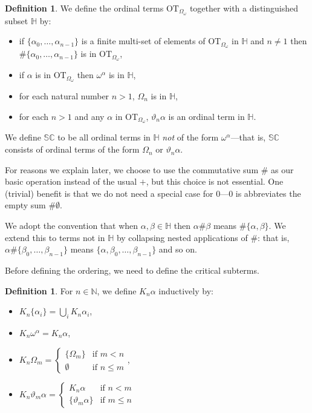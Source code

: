 \documentclass[11pt]{amsart}
\theoremstyle{definition}
\newtheorem{definition}[theorem]{Definition}
\begin{document}
\begin{definition}
  We define the ordinal terms $\mathrm{OT}_{\Omega_\omega}$ together with a distinguished subset $\mathbb{H}$ by:
  \begin{itemize}
  \item if $\{\alpha_0,\ldots,\alpha_{n-1}\}$ is a finite multi-set of elements of $\mathrm{OT}_{\Omega_\omega}$ in $\mathbb{H}$ and $n\neq 1$ then $\#\{\alpha_0,\ldots,\alpha_{n-1}\}$ is in $\mathrm{OT}_{\Omega_\omega}$,
  \item if $\alpha$ is in $\mathrm{OT}_{\Omega_\omega}$ then $\omega^\alpha$ is in $\mathbb{H}$,
  \item for each natural number $n>1$, $\Omega_n$ is in $\mathbb{H}$,
  \item for each $n>1$ and any $\alpha$ in $\mathrm{OT}_{\Omega_\omega}$, $\vartheta_n\alpha$ is an ordinal term in $\mathbb{H}$.
  \end{itemize}

  We define $\mathbb{SC}$ to be all ordinal terms in $\mathbb{H}$ \emph{not} of the form $\omega^\alpha$---that is, $\mathbb{SC}$ consists of ordinal terms of the form $\Omega_n$ or $\vartheta_n\alpha$.
\end{definition}

For reasons we explain later, we choose to use the commutative sum $\#$ as our basic operation instead of the usual $+$, but this choice is not essential. One (trivial) benefit is that we do not need a special case for $0$---$0$ is abbreviates the empty sum $\#\emptyset$.

We adopt the convention that when $\alpha,\beta\in \mathbb{H}$ then $\alpha\#\beta$ means $\#\{\alpha,\beta\}$. We extend this to terms not in $\mathbb{H}$ by collapsing nested applications of $\#$: that is, $\alpha\#\{\beta_0,\ldots,\beta_{n-1}\}$ means $\{\alpha,\beta_0,\ldots,\beta_{n-1}\}$ and so on.

Before defining the ordering, we need to define the critical subterms.
\begin{definition}
  For $n\in\mathbb{N}$, we define $K_n\alpha$ inductively by:
  \begin{itemize}
  \item $K_n\{\alpha_i\}=\bigcup_i K_n\alpha_i$,
  \item $K_n\omega^\alpha=K_n\alpha$,
  \item $K_n\Omega_m=\left\{\begin{array}{ll}
                              \{\Omega_m\}&\text{if }m<n\\
                              \emptyset&\text{if }n\leq m
                                         \end{array}\right.$,
  \item $K_n\vartheta_m\alpha=\left\{\begin{array}{ll}
        K_n\alpha&\text{if }n<m\\
        \{\vartheta_m\alpha\}&\text{if }m\leq n
        \end{array}\right.$
  \end{itemize}
\end{definition}
\end{document}
